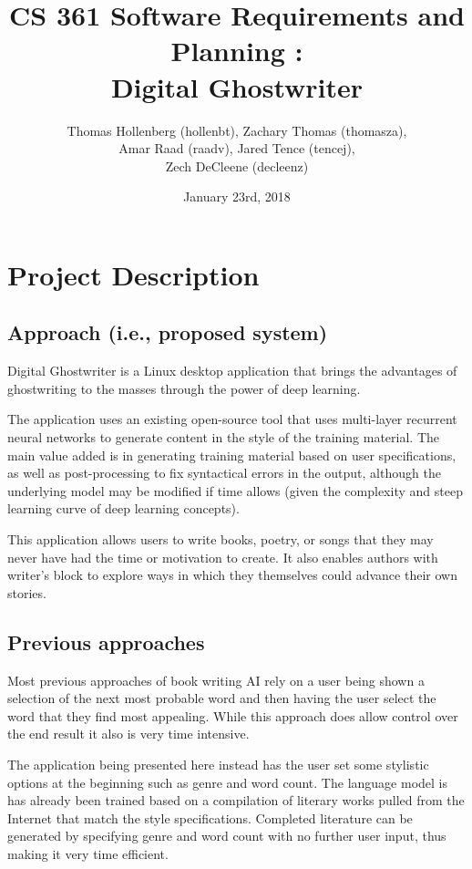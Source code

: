\documentclass[12pt]{article}
\title{CS 361 Software Requirements and Planning : \\ Digital Ghostwriter}
\author{Thomas Hollenberg (hollenbt), Zachary Thomas (thomasza),\\ Amar Raad (raadv), Jared Tence (tencej),\\ Zech DeCleene (decleenz)}
\date{January 23rd, 2018}
\begin{document}
\maketitle
\tableofcontents

\newpage

\section{Project Description}

\subsection{Approach (i.e., proposed system)}

Digital Ghostwriter is a Linux desktop application that brings the advantages of ghostwriting to the masses through the power of deep learning.

The application uses an existing open-source tool that uses multi-layer recurrent neural networks to generate content in the style of the training material. The main value added is in generating training material based on user specifications, as well as post-processing to fix syntactical errors in the output, although the underlying model may be modified if time allows (given the complexity and steep learning curve of deep learning concepts).

This application allows users to write books, poetry, or songs that they may never have had the time or motivation to create. It also enables authors with writer's block to explore ways in which they themselves could advance their own stories.

\subsection{Previous approaches}

Most previous approaches of book writing AI rely on a user being shown a selection of the next most probable word and then having the user select the word that they find most appealing. While this approach does allow control over the end result it also is very time intensive.\cite{JapaneseAIWritesaNovel}

The application being presented here instead has the user set some stylistic options at the beginning such as genre and word count. The language model is has already been trained based on a compilation of literary works pulled from the Internet that match the style specifications. Completed literature can be generated by specifying genre and word count with no further user input, thus making it very time efficient.
\end{document}

